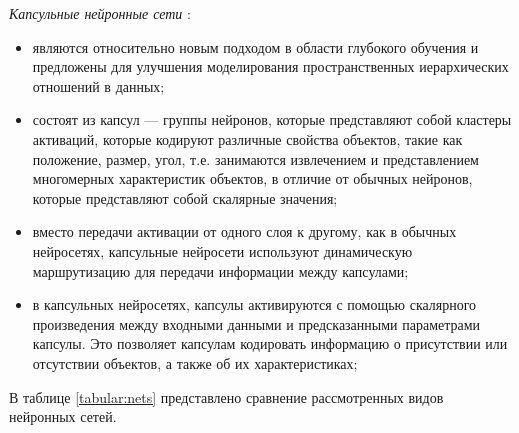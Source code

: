 \textit{Капсульные нейронные сети} \cite{capsules}:
\begin{itemize}
    \item являются относительно новым подходом в области глубокого обучения и предложены для улучшения моделирования пространственных иерархических отношений в данных;
    \item состоят из капсул --- группы нейронов, которые представляют собой кластеры активаций, которые кодируют различные свойства объектов, такие как положение, размер, угол, т.е. занимаются извлечением и представлением многомерных характеристик объектов, в отличие от обычных нейронов, которые представляют собой скалярные значения;
    \item вместо передачи активации от одного слоя к другому, как в обычных нейросетях, капсульные нейросети используют динамическую маршрутизацию для передачи информации между капсулами;
    \item в капсульных нейросетях, капсулы активируются с помощью скалярного произведения между входными данными и предсказанными параметрами капсулы. Это позволяет капсулам кодировать информацию о присутствии или отсутствии объектов, а также об их характеристиках;
    
\end{itemize}

В таблице \ref{tabular:nets} представлено сравнение рассмотренных видов нейронных сетей.

